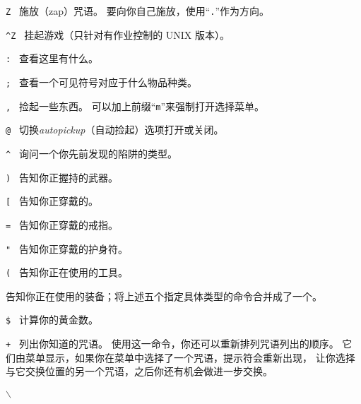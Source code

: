 \documentclass[a4paper, 10pt]{article}
\newcommand{\tb}[1]{\tt #1 \hfill}
\begin{document}
\item[\tb{Z}]
施放（zap）咒语。
要向你自己施放，使用“{\tt .}”作为方向。
\item[\tb{\^{}Z}]
挂起游戏（只针对有作业控制的 UNIX 版本）。
\item[\tb{:}]
查看这里有什么。
\item[\tb{;}]
查看一个可见符号对应于什么物品种类。
\item[\tb{,}]
捡起一些东西。
可以加上前缀“{\tt m}”来强制打开选择菜单。
\item[\tb{@}]
切换{\it autopickup\/}（自动捡起）选项打开或关闭。
\item[\tb{\^{}}]
询问一个你先前发现的陷阱的类型。
\item[\tb{)}]
告知你正握持的武器。
\item[\tb{[}]
告知你正穿戴的\zhTransArmor{}。
\item[\tb{=}]
告知你正穿戴的戒指。
\item[\tb{"}]
告知你正穿戴的护身符。
\item[\tb{(}]
告知你正在使用的工具。
\item[\tb{*}]
告知你正在使用的装备；将上述五个指定具体类型的命令合并成了一个。
\item[\tb{\$}]
计算你的黄金数。
\item[\tb{+}]
列出你知道的咒语。
使用这一命令，你还可以重新排列咒语列出的顺序。
它们由菜单显示，如果你在菜单中选择了一个咒语，提示符会重新出现，
让你选择与它交换位置的另一个咒语，之后你还有机会做进一步交换。
\item[\tb{$\backslash$}]
\end{document}
